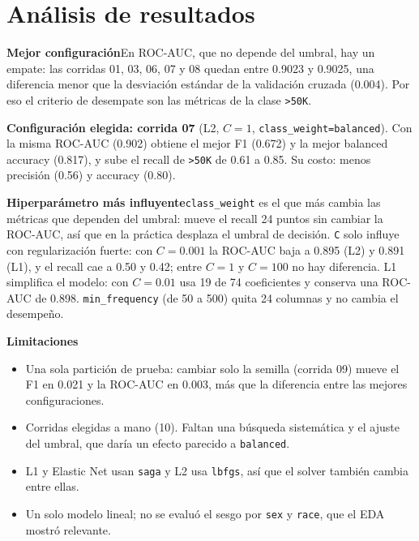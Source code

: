 \documentclass[11pt,letterpaper]{article}
\newcommand{\bloque}[1]{{\bfseries #1}\quad}
\begin{document}
\section{Análisis de resultados}

\bloque{Mejor configuración}En ROC-AUC, que no depende del umbral, hay un empate: las corridas 01, 03, 06, 07 y 08
quedan entre 0.9023 y 0.9025, una diferencia menor que la desviación estándar de la validación cruzada (0.004).
Por eso el criterio de desempate son las métricas de la clase \texttt{>50K}.

\begin{destacado}
\small{}
{\bfseries Configuración elegida: corrida 07} (L2, $C=1$, \texttt{class\_weight=balanced}).
Con la misma ROC-AUC (0.902) obtiene el mejor F1 (0.672) y la mejor balanced accuracy (0.817), y sube el recall de
\texttt{>50K} de 0.61 a 0.85. Su costo: menos precisión (0.56) y accuracy (0.80).
\end{destacado}

\bloque{Hiperparámetro más influyente}\texttt{class\_weight} es el que más cambia las métricas que dependen del
umbral: mueve el recall 24 puntos sin cambiar la ROC-AUC, así que en la práctica desplaza el umbral de decisión.
\texttt{C} solo influye con regularización fuerte: con $C=0.001$ la ROC-AUC baja a 0.895 (L2) y 0.891 (L1), y el
recall cae a 0.50 y 0.42; entre $C=1$ y $C=100$ no hay diferencia. L1 simplifica el modelo: con $C=0.01$ usa 19 de
74 coeficientes y conserva una ROC-AUC de 0.898. \texttt{min\_frequency} (de 50 a 500) quita 24 columnas y no cambia
el desempeño.

\bloque{Limitaciones}
\begin{itemize}
  \item Una sola partición de prueba: cambiar solo la semilla (corrida 09) mueve el F1 en 0.021 y la ROC-AUC en
        0.003, más que la diferencia entre las mejores configuraciones.
  \item Corridas elegidas a mano (10). Faltan una búsqueda sistemática y el ajuste del umbral, que daría un efecto
        parecido a \texttt{balanced}.
  \item L1 y Elastic Net usan \texttt{saga} y L2 usa \texttt{lbfgs}, así que el solver también cambia entre ellas.
  \item Un solo modelo lineal; no se evaluó el sesgo por \texttt{sex} y \texttt{race}, que el EDA mostró relevante.
\end{itemize}
\end{document}
